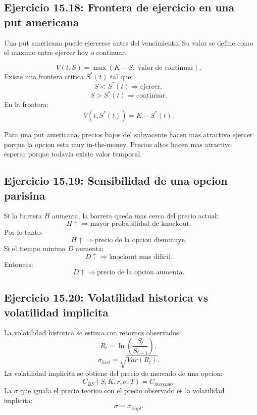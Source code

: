 \documentclass[12pt,a4paper]{article}
\begin{document}
\subsection{Ejercicio 15.18: Frontera de ejercicio en una put americana}

\begin{markdowncell}
Una put americana puede ejercerse antes del vencimiento. Su valor se define como el maximo entre ejercer hoy o continuar.
\end{markdowncell}

\begin{latexcell}
\[
V(t,S)=\max(K-S,\; \text{valor de continuar}).
\]
Existe una frontera critica \(S^*(t)\) tal que:
\[
S<S^*(t) \Rightarrow \text{ejercer},
\]
\[
S>S^*(t) \Rightarrow \text{continuar}.
\]
En la frontera:
\[
V(t,S^*(t))=K-S^*(t).
\]
\end{latexcell}

\begin{interpretacion}
Para una put americana, precios bajos del subyacente hacen mas atractivo ejercer porque la opcion esta muy in-the-money. Precios altos hacen mas atractivo esperar porque todavia existe valor temporal.
\end{interpretacion}

\subsection{Ejercicio 15.19: Sensibilidad de una opcion parisina}

\begin{latexcell}
Si la barrera \(H\) aumenta, la barrera queda mas cerca del precio actual:
\[
H \uparrow \Rightarrow \text{mayor probabilidad de knockout}.
\]
Por lo tanto:
\[
H \uparrow \Rightarrow \text{precio de la opcion disminuye}.
\]
Si el tiempo minimo \(D\) aumenta:
\[
D \uparrow \Rightarrow \text{knockout mas dificil}.
\]
Entonces:
\[
D \uparrow \Rightarrow \text{precio de la opcion aumenta}.
\]
\end{latexcell}

\subsection{Ejercicio 15.20: Volatilidad historica vs volatilidad implicita}

\begin{latexcell}
La volatilidad historica se estima con retornos observados:
\[
R_t=\ln\left(\frac{S_t}{S_{t-1}}\right),
\]
\[
\sigma_{hist}=\sqrt{Var(R_t)}.
\]
La volatilidad implicita se obtiene del precio de mercado de una opcion:
\[
C_{BS}(S,K,r,\sigma,T)=C_{mercado}.
\]
La \(\sigma\) que iguala el precio teorico con el precio observado es la volatilidad implicita:
\[
\sigma=\sigma_{impl}.
\]
\end{latexcell}
\end{document}
